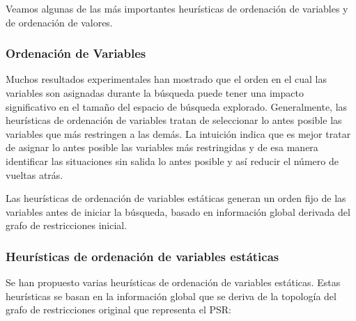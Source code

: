 \documentclass[a4paper]{article}
\begin{document}
Veamos algunas de las más importantes heurísticas de ordenación de variables y de ordenación de valores.\\

\subsubsection*{Ordenación de Variables}

Muchos resultados experimentales han mostrado que el orden en el cual las variables son asignadas durante la búsqueda puede tener una impacto significativo en el tamaño del espacio de búsqueda explorado. Generalmente, las heurísticas de ordenación de variables tratan de seleccionar lo antes posible las variables que más restringen a las demás. La intuición indica que es mejor tratar de asignar lo antes posible las variables más restringidas y de esa manera identificar las situaciones sin salida lo antes posible y así reducir el número de vueltas atrás.

Las heurísticas de ordenación de variables estáticas generan un orden fijo de las variables antes de iniciar la búsqueda, basado en información global derivada del grafo de restricciones inicial.

\subsubsection*{Heurísticas de ordenación de variables estáticas}
Se han propuesto varias heurísticas de ordenación de variables estáticas. Estas heurísticas se basan en la información global que se deriva de la topología del grafo de restricciones original que representa el PSR:
\end{document}
